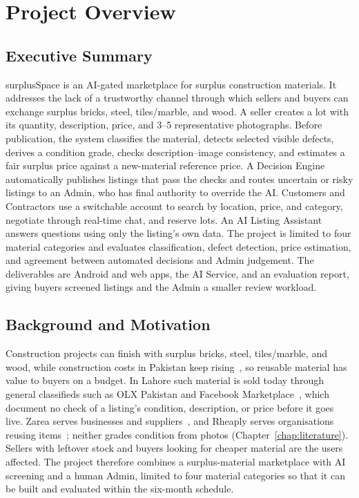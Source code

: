 
\chapter{Project Overview}
\label{chap:overview}

\section{Executive Summary}
surplusSpace is an AI-gated marketplace for surplus construction materials. It
addresses the lack of a trustworthy channel through which sellers and buyers can
exchange surplus bricks, steel, tiles/marble, and wood. A seller creates a
lot with its quantity, description, price, and 3--5 representative photographs.
Before publication, the system classifies the material, detects selected visible
defects, derives a condition grade, checks description--image consistency, and
estimates a fair surplus price against a new-material reference price. A Decision
Engine automatically publishes listings that pass the checks and routes uncertain
or risky listings to an Admin, who has final authority to override the AI.
Customers and Contractors use a switchable account to search by location, price,
and category, negotiate through real-time chat, and reserve lots. An AI Listing
Assistant answers questions using only the listing's own data. The project is
limited to four material categories and evaluates classification, defect
detection, price estimation, and agreement between automated decisions and Admin
judgement. The deliverables are Android and web apps, the AI Service, and an evaluation
report, giving buyers screened listings and the Admin a smaller review workload.

\section{Background and Motivation}
Construction projects can finish with surplus bricks, steel, tiles/marble, and wood,
while construction costs in Pakistan keep rising~\citep{thenewscosts2026}, so reusable
material has value to buyers on a budget. In Lahore such material is sold today through
general classifieds such as OLX Pakistan and Facebook Marketplace~\citep{olxpakistan,facebookmarketplace},
which document no check of a listing's condition, description, or price before it goes
live. Zarea serves businesses and suppliers~\citep{zareaabout}, and Rheaply serves
organisations reusing items~\citep{rheaplyfeatures}; neither grades condition from
photos (Chapter~\ref{chap:literature}). Sellers with leftover stock and buyers looking for
cheaper material are the users affected. The project therefore combines a surplus-material
marketplace with AI screening and a human Admin, limited to four material categories so
that it can be built and evaluated within the six-month schedule.

